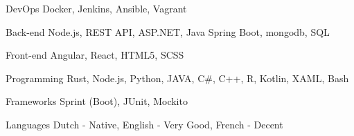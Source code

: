 

\begin{cvskills}

  \cvskill
    {DevOps} %
    {Docker, Jenkins, Ansible, Vagrant} %

  \cvskill
    {Back-end} %
    {Node.js, REST API, ASP.NET, Java Spring Boot, mongodb, SQL} %

  \cvskill
    {Front-end} %
    {Angular, React, HTML5, SCSS} %

  \cvskill
    {Programming} %
    {Rust, Node.js, Python, JAVA, C\#, C++, R, Kotlin, XAML, Bash} %

  \cvskill
    {Frameworks} %
	{Sprint (Boot), JUnit, Mockito} %

  \cvskill
    {Languages} %
	{Dutch - Native, English - Very Good, French - Decent} %

\end{cvskills}
